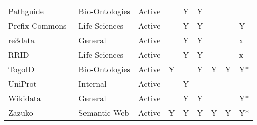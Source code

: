 \begin{table}
\begin{tabular}{lllllllll}
                              Pathguide &  Bio-Ontologies &       Active &                           &                      Y &                              Y &                        &                      &                        \\
    Prefix Commons~\cite{prefixcommons} &   Life Sciences &       Active &                           &                      Y &                              Y &                        &                      &                      Y \\
              re3data~\cite{Pampel2013} &         General &       Active &                           &                      Y &                              Y &                        &                      &                      x \\
                                   RRID &   Life Sciences &       Active &                           &                      Y &                              Y &                        &                      &                      x \\
                                 TogoID &  Bio-Ontologies &       Active &                         Y &                        &                              Y &                      Y &                    Y &                     Y* \\
             UniProt~\cite{Bateman2021} &        Internal &       Active &                           &                      Y &                                &                        &                      &                        \\
        Wikidata~\cite{Waagmeester2020} &         General &       Active &                           &                      Y &                              Y &                        &                      &                     Y* \\
                                 Zazuko &    Semantic Web &       Active &                         Y &                      Y &                              Y &                      Y &                    Y &                     Y* \\
\bottomrule
\end{tabular}
\end{table}
